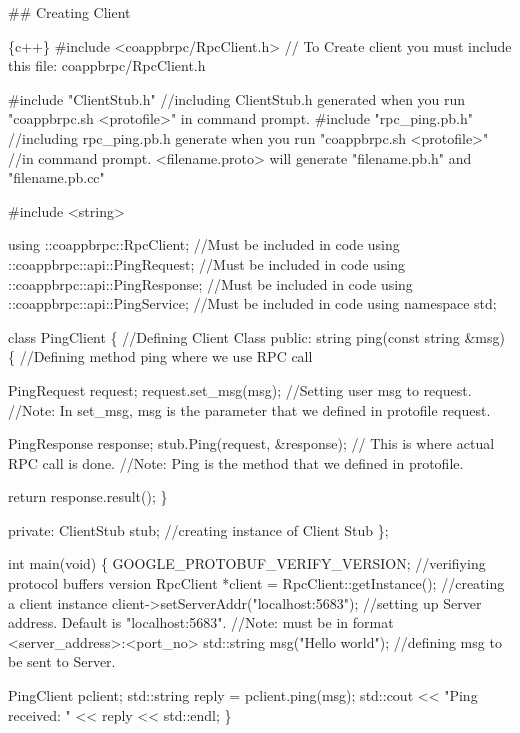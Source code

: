 \#\# Creating Client 
\begin{DoxyCode}
\{c++\}
#include <coappbrpc/RpcClient.h> // To Create client you must include this file: coappbrpc/RpcClient.h

#include "ClientStub.h" //including ClientStub.h generated when you run "coappbrpc.sh <protofile>" in
       command prompt.
#include "rpc\_ping.pb.h" //including rpc\_ping.pb.h generate when you run "coappbrpc.sh <protofile>" 
//in command prompt. <filename.proto> will generate "filename.pb.h" and "filename.pb.cc"

#include <string>

using ::coappbrpc::RpcClient;  //Must be included in code
using ::coappbrpc::api::PingRequest; //Must be included in code
using ::coappbrpc::api::PingResponse; //Must be included in code
using ::coappbrpc::api::PingService; //Must be included in code
using namespace std;

class PingClient \{ //Defining Client Class
public:
  string ping(const string &msg) \{ //Defining method ping where we use RPC call

    PingRequest request;
    request.set\_msg(msg); //Setting user msg to request. 
    //Note: In set\_msg, msg is the parameter that we defined in protofile request.

    PingResponse response;
    stub.Ping(request, &response); // This is where actual RPC call is done.
   //Note: Ping is the method that we defined in protofile.

    return response.result();
  \}

private:
    ClientStub stub; //creating instance of Client Stub
\};

int main(void) \{
  GOOGLE\_PROTOBUF\_VERIFY\_VERSION; //verifiying protocol buffers version
  RpcClient *client = RpcClient::getInstance(); //creating a client instance
  client->setServerAddr("localhost:5683"); //setting up Server address. Default is "localhost:5683". 
                                        //Note: must be in format <server\_address>:<port\_no>
  std::string msg("Hello world"); //defining msg to be sent to Server.

  PingClient pclient;
  std::string reply = pclient.ping(msg);
  std::cout << "Ping received: " << reply << std::endl;
\}
\end{DoxyCode}


